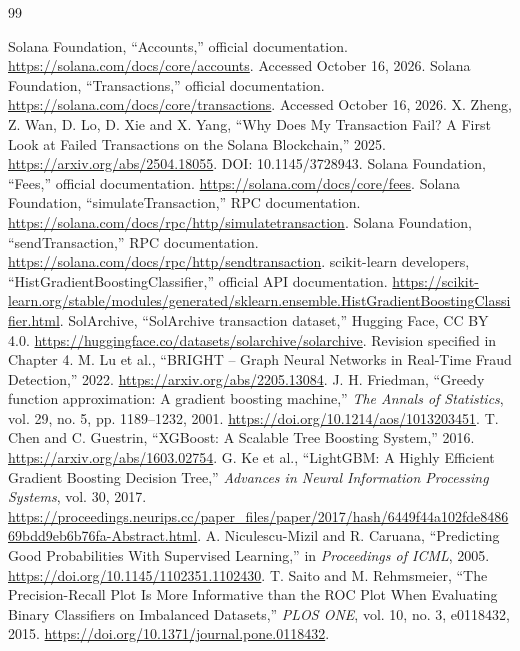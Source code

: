 \documentclass[12pt,a4paper,oneside]{report}
\begin{document}
\begingroup
\renewcommand{\bibname}{REFERENCES}
\begin{thebibliography}{99}
\small\raggedright\setlength{\itemsep}{7pt}
 Solana Foundation, ``Accounts,'' official documentation. \url{https://solana.com/docs/core/accounts}. Accessed October 16, 2026.
 Solana Foundation, ``Transactions,'' official documentation. \url{https://solana.com/docs/core/transactions}. Accessed October 16, 2026.
 X. Zheng, Z. Wan, D. Lo, D. Xie and X. Yang, ``Why Does My Transaction Fail? A First Look at Failed Transactions on the Solana Blockchain,'' 2025. \url{https://arxiv.org/abs/2504.18055}. DOI: 10.1145/3728943.
 Solana Foundation, ``Fees,'' official documentation. \url{https://solana.com/docs/core/fees}.
 Solana Foundation, ``simulateTransaction,'' RPC documentation. \url{https://solana.com/docs/rpc/http/simulatetransaction}.
 Solana Foundation, ``sendTransaction,'' RPC documentation. \url{https://solana.com/docs/rpc/http/sendtransaction}.
 scikit-learn developers, ``HistGradientBoostingClassifier,'' official API documentation. \url{https://scikit-learn.org/stable/modules/generated/sklearn.ensemble.HistGradientBoostingClassifier.html}.
 SolArchive, ``SolArchive transaction dataset,'' Hugging Face, CC BY 4.0. \url{https://huggingface.co/datasets/solarchive/solarchive}. Revision specified in Chapter 4.
 M. Lu et al., ``BRIGHT -- Graph Neural Networks in Real-Time Fraud Detection,'' 2022. \url{https://arxiv.org/abs/2205.13084}.
 J. H. Friedman, ``Greedy function approximation: A gradient boosting machine,'' \emph{The Annals of Statistics}, vol. 29, no. 5, pp. 1189--1232, 2001. \url{https://doi.org/10.1214/aos/1013203451}.
 T. Chen and C. Guestrin, ``XGBoost: A Scalable Tree Boosting System,'' 2016. \url{https://arxiv.org/abs/1603.02754}.
 G. Ke et al., ``LightGBM: A Highly Efficient Gradient Boosting Decision Tree,'' \emph{Advances in Neural Information Processing Systems}, vol. 30, 2017. \url{https://proceedings.neurips.cc/paper_files/paper/2017/hash/6449f44a102fde848669bdd9eb6b76fa-Abstract.html}.
 A. Niculescu-Mizil and R. Caruana, ``Predicting Good Probabilities With Supervised Learning,'' in \emph{Proceedings of ICML}, 2005. \url{https://doi.org/10.1145/1102351.1102430}.
 T. Saito and M. Rehmsmeier, ``The Precision-Recall Plot Is More Informative than the ROC Plot When Evaluating Binary Classifiers on Imbalanced Datasets,'' \emph{PLOS ONE}, vol. 10, no. 3, e0118432, 2015. \url{https://doi.org/10.1371/journal.pone.0118432}.

\end{thebibliography}
\end{document}
